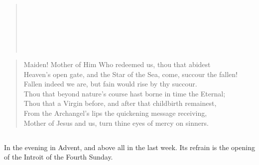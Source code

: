 \begin{verse}
 \\
 \\
 \\
 \\
 \\
\end{verse}
\begin{verse}
Maiden! Mother of Him Who redeemed us, thou that abidest \\
Heaven's open gate, and the Star of the Sea, come, succour the fallen! \\
Fallen indeed we are, but fain would rise by thy succour. \\
Thou that beyond nature's course hast borne in time the Eternal; \\
Thou that a Virgin before, and after that childbirth remainest, \\
From the Archangel's lips the quickening message receiving, \\
Mother of Jesus and us, turn thine eyes of mercy on sinners.
\end{verse}

\subsection{}

In the evening in Advent, and above all in the last week. Its refrain is the
opening of the Introit of the Fourth Sunday.


